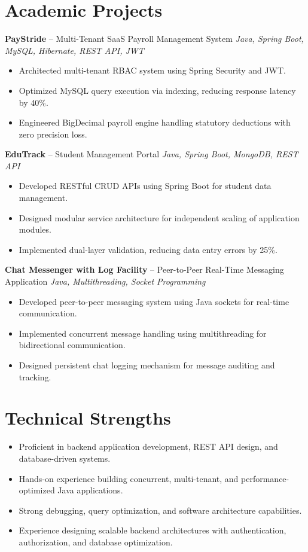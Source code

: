 \documentclass[10.5pt,a4paper]{article}
\begin{document}
\section{Academic Projects}
\textbf{PayStride} -- Multi-Tenant SaaS Payroll Management System \hfill \textit{Java, Spring Boot, MySQL, Hibernate, REST API, JWT}
\begin{itemize}
  \item Architected multi-tenant RBAC system using Spring Security and JWT.
  \item Optimized MySQL query execution via indexing, reducing response latency by 40\%.
  \item Engineered BigDecimal payroll engine handling statutory deductions with zero precision loss.
\end{itemize}
\vspace{4pt}
\textbf{EduTrack} -- Student Management Portal \hfill \textit{Java, Spring Boot, MongoDB, REST API}
\begin{itemize}
  \item Developed RESTful CRUD APIs using Spring Boot for student data management.
  \item Designed modular service architecture for independent scaling of application modules.
  \item Implemented dual-layer validation, reducing data entry errors by 25\%.
\end{itemize}
\vspace{4pt}
\textbf{Chat Messenger with Log Facility} -- Peer-to-Peer Real-Time Messaging Application \hfill \textit{Java, Multithreading, Socket Programming}
\begin{itemize}
  \item Developed peer-to-peer messaging system using Java sockets for real-time communication.
  \item Implemented concurrent message handling using multithreading for bidirectional communication.
  \item Designed persistent chat logging mechanism for message auditing and tracking.
\end{itemize}
\section{Technical Strengths}
\begin{itemize}
  \item Proficient in backend application development, REST API design, and database-driven systems.
  \item Hands-on experience building concurrent, multi-tenant, and performance-optimized Java applications.
  \item Strong debugging, query optimization, and software architecture capabilities.
  \item Experience designing scalable backend architectures with authentication, authorization, and database optimization.
\end{itemize}
\end{document}
